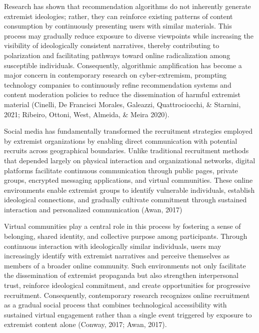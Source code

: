\documentclass{NSP1}
\begin{document}
Research has shown that recommendation algorithms do not inherently generate extremist ideologies; rather, they can reinforce existing patterns of content consumption by continuously presenting users with similar materials. This process may gradually reduce exposure to diverse viewpoints while increasing the visibility of ideologically consistent narratives, thereby contributing to polarization and facilitating pathways toward online radicalization among susceptible individuals. Consequently, algorithmic amplification has become a major concern in contemporary research on cyber-extremism, prompting technology companies to continuously refine recommendation systems and content moderation policies to reduce the dissemination of harmful extremist material (Cinelli, De Francisci Morales, Galeazzi, Quattrociocchi, \& Starnini, 2021; Ribeiro, Ottoni, West, Almeida, \& Meira 2020).

\par\medskip{}\smallskip

Social media has fundamentally transformed the recruitment strategies employed by extremist organizations by enabling direct communication with potential recruits across geographical boundaries. Unlike traditional recruitment methods that depended largely on physical interaction and organizational networks, digital platforms facilitate continuous communication through public pages, private groups, encrypted messaging applications, and virtual communities. These online environments enable extremist groups to identify vulnerable individuals, establish ideological connections, and gradually cultivate commitment through sustained interaction and personalized communication (Awan, 2017)

Virtual communities play a central role in this process by fostering a sense of belonging, shared identity, and collective purpose among participants. Through continuous interaction with ideologically similar individuals, users may increasingly identify with extremist narratives and perceive themselves as members of a broader online community. Such environments not only facilitate the dissemination of extremist propaganda but also strengthen interpersonal trust, reinforce ideological commitment, and create opportunities for progressive recruitment. Consequently, contemporary research recognizes online recruitment as a gradual social process that combines technological accessibility with sustained virtual engagement rather than a single event triggered by exposure to extremist content alone (Conway, 2017; Awan, 2017).
\end{document}
